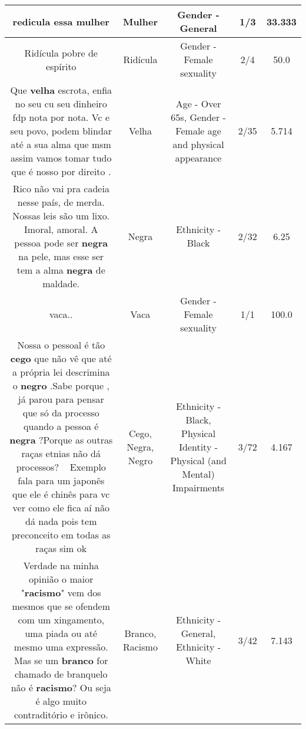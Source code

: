 \documentclass[11pt]{article}
\newlength\mylength
\begin{document}
\begin{center}
\begin{longtable}{|C{.65\mylength}|C{.30\mylength}|C{.12\mylength}|C{.12\mylength}|C{.12\mylength}|}
  \small redicula essa mulher\normalsize   & Mulher & Gender - General & 1/3 & 33.333 \\  \hline
  \small Ridícula pobre de espírito\normalsize   & Ridícula & Gender - Female sexuality & 2/4 & 50.0 \\  \hline
  \small Que \textbf{v\textbf{elha}} escrota, enfia no seu cu seu dinheiro fdp nota por nota. Vc e seu povo, podem blindar até a sua alma que msm assim vamos tomar tudo que é nosso por direito .\normalsize   & Velha & Age - Over 65s, Gender - Female age and physical appearance & 2/35 & 5.714 \\  \hline
  \small Rico não vai pra cadeia nesse país, de merda.  Nossas leis são um lixo. Imoral, amoral. A pessoa pode  ser \textbf{negra} na pele, mas esse ser  tem a alma \textbf{negra} de  maldade.\normalsize   & Negra & Ethnicity - Black & 2/32 & 6.25 \\  \hline
  \small vaca..\normalsize   & Vaca & Gender - Female sexuality & 1/1 & 100.0 \\  \hline
  \small Nossa o pessoal é tão \textbf{cego} que não vê que até a própria lei descrimina o \textbf{negro} .Sabe porque , já parou para pensar que só da processo quando a pessoa é \textbf{negra} ?Porque as outras raças etnias não dá processos? 🤷🏼‍♂️Exemplo fala para um japonês que ele é chinês para vc ver como ele fica aí não dá nada pois tem preconceito em todas as raças sim ok\normalsize   & Cego, Negra, Negro & Ethnicity - Black, Physical Identity - Physical (and Mental) Impairments & 3/72 & 4.167 \\  \hline
  \small Verdade na minha opinião o maior "\textbf{racismo}" vem dos mesmos que se ofendem com um xingamento, uma piada ou até mesmo uma expressão. Mas se um \textbf{branco} for chamado de branquelo não é \textbf{racismo}? Ou seja é algo muito contraditório e irônico.\normalsize   & Branco, Racismo & Ethnicity - General, Ethnicity - White & 3/42 & 7.143 \\  \hline

\end{longtable}
\end{center}
\end{document}
